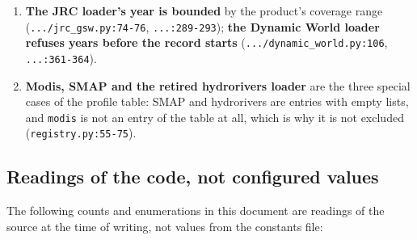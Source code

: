 \documentclass[11pt,a4paper]{article}
\newcommand{\code}[1]{\texttt{#1}}
\begin{document}
\begin{enumerate}
{products.} It reads the Dynamic World modal-label raster, the JRC occurrence
fraction and the Overture building fraction and combines them with the
weights ,
 and . A
component that fails to load silently becomes a neutral constant ---
 for the habitat component,
the same neutral fraction for the water component, and
 for remoteness (\code{.../wildlife.py:21-23},
\code{.../wildlife.py:200-233}). The substitution is recorded in the log
and nowhere else: the loader emits a warning naming the component that
failed and the neutral value it used (\code{.../wildlife.py:200-233}), and
the manifest entry it writes is identical for a fully computed proxy and for
a neutral one. Nothing in the manifest or in the status map shows that a
component was substituted, so a reader who must trust the proxy has to read
the download log.
\item \textbf{The JRC loader's year is bounded} by the product's coverage
range (\code{.../jrc\_gsw.py:74-76}, \code{...:289-293}); \textbf{the Dynamic
World loader refuses years before the record starts}
(\code{.../dynamic\_world.py:106}, \code{...:361-364}).
\item \textbf{Modis, SMAP and the retired hydrorivers loader} are the three
special cases of the profile table: SMAP and hydrorivers are entries with
empty lists, and \code{modis} is not an entry of the table at all, which is
why it is not excluded
(\code{registry.py:55-75}).
\end{enumerate}

\subsection{Readings of the code, not configured values}

The following counts and enumerations in this document are readings of the
source at the time of writing, not values from the constants file:
\end{document}
